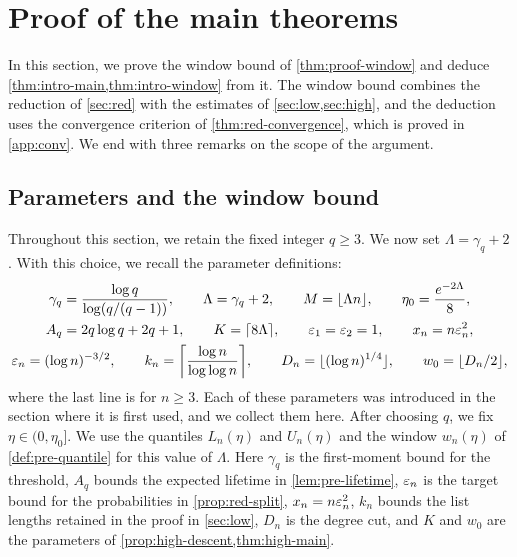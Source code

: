 \chapter{Proof of the main theorems}\label{sec:proof}

In this section, we prove the window bound of \cref{thm:proof-window} and deduce \cref{thm:intro-main,thm:intro-window} from it. The window bound combines the reduction of \cref{sec:red} with the estimates of \cref{sec:low,sec:high}, and the deduction uses the convergence criterion of \cref{thm:red-convergence}, which is proved in \cref{app:conv}. We end with three remarks on the scope of the argument.

\section{Parameters and the window bound}\label{sec:proof-window}

Throughout this section, we retain the fixed integer $q \ge 3$. We now set $\Lambda = \gamma_q + 2$. With this choice, we recall the parameter definitions:
\begin{equation}\label{eq:proof-params}
\begin{gathered}
\gamma_q = \frac{\log q}{\log (q / (q - 1))}, \qquad \Lambda = \gamma_q + 2, \qquad M = \lfloor \Lambda n \rfloor, \qquad \eta_0 = \frac{e^{-2 \Lambda}}{8}, \\
A_q = 2q \log q + 2q + 1, \qquad K = \lceil 8 \Lambda \rceil, \qquad \varepsilon_1 = \varepsilon_2 = 1, \qquad x_n = n \varepsilon_n^2, \\
\varepsilon_n = (\log n)^{-3/2}, \qquad k_n = \biggl\lceil \frac{\log n}{\log \log n} \biggr\rceil, \qquad D_n = \lfloor (\log n)^{1/4} \rfloor, \qquad w_0 = \lfloor D_n / 2 \rfloor,
\end{gathered}
\end{equation}
where the last line is for $n \ge 3$. Each of these parameters was introduced in the section where it is first used, and we collect them here. After choosing $q$, we fix $\eta \in (0, \eta_0]$. We use the quantiles $L_n(\eta)$ and $U_n(\eta)$ and the window $w_n(\eta)$ of \cref{def:pre-quantile} for this value of $\Lambda$. Here $\gamma_q$ is the first-moment bound for the threshold, $A_q$ bounds the expected lifetime in \cref{lem:pre-lifetime}, $\varepsilon_n$ is the target bound for the probabilities in \cref{prop:red-split}, $x_n = n \varepsilon_n^2$, $k_n$ bounds the list lengths retained in the proof in \cref{sec:low}, $D_n$ is the degree cut, and $K$ and $w_0$ are the parameters of \cref{prop:high-descent,thm:high-main}.

